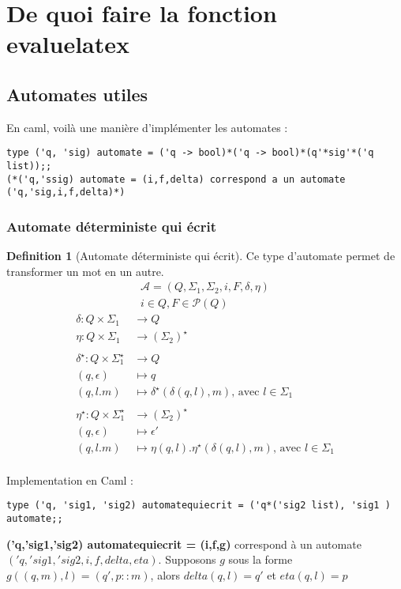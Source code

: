 \documentclass{article}
\theoremstyle{definition}
\newtheorem{definition}{Definition}[section]
\begin{document}
\section{De quoi faire la fonction evaluelatex}
\subsection{Automates utiles}
En caml, voilà une manière d'implémenter les automates : 
\begin{lstlisting}
type ('q, 'sig) automate = ('q -> bool)*('q -> bool)*(q'*sig'*('q list));;
(*('q,'ssig) automate = (i,f,delta) correspond a un automate ('q,'sig,i,f,delta)*)
\end{lstlisting}

\subsubsection{Automate déterministe qui écrit}
\begin{definition}[Automate déterministe qui écrit]
Ce type d'automate permet de transformer un mot en un autre.\\
\begin{gather*}
    \mathcal{A} = (Q,\Sigma_1 ,\Sigma_2, i, F, \delta, \eta) \\
    i\in Q,F \in \mathcal{P} (Q)
\end{gather*}
\begin{align*} 
    \delta : Q\times \Sigma_1 &\rightarrow Q \\
    \eta : Q\times \Sigma_1 &\rightarrow (\Sigma_2 )^\star\\
    \\             
    \delta^\star : Q\times \Sigma_1 ^\star &\rightarrow Q \\
    (q,\epsilon) &\mapsto q\\
    (q,l.m) &\mapsto \delta^\star(\delta(q,l),m)\text{, avec }l\in \Sigma_1\\
    \\
    \eta^\star : Q\times \Sigma_1 ^\star &\rightarrow (\Sigma_2)^\star \\
    (q,\epsilon) &\mapsto \epsilon '\\
    (q,l.m) &\mapsto \eta(q,l).\eta^\star(\delta(q,l),m)\text{, avec }l\in \Sigma_1\\
\end{align*}

\end{definition}
Implementation en Caml : 
\begin{lstlisting}
type ('q, 'sig1, 'sig2) automatequiecrit = ('q*('sig2 list), 'sig1 ) automate;;
\end{lstlisting}
\textbf{('q,'sig1,'sig2) automatequiecrit = (i,f,g)} correspond \`a un automate $('q,'sig1,'sig2,i,f,delta,eta)$. Supposons $g$ sous la forme $g((q,m),l) = (q',p::m)$, alors $delta(q,l) = q'$ et $eta(q,l) = p$
\newpage
\end{document}
